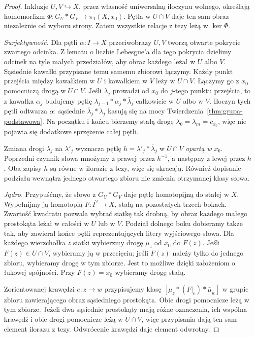 \begin{proof}
Inkluzje $U,V\hookrightarrow X$, przez własność uniwersalną
iloczynu wolnego, określają homomorfizm
$\Phi:G_U*G_V\to\pi_1(X,x_0)$.
Pętla w $U\cap V$ daje ten sam obraz
niezależnie od wyboru strony.
Zatem wszystkie relacje z tezy
leżą w $\ker\Phi$.

\emph{Surjektywność.} Dla pętli
$\alpha:I\to X$ przeciwobrazy $U,V$
tworzą otwarte pokrycie zwartego odcinka.
Z lematu o liczbie Lebesgue'a dla tego pokrycia
dzielimy odcinek na tyle małych przedziałów,
aby obraz każdego leżał w $U$ albo $V$.
Sąsiednie kawałki przypisane temu
samemu zbiorowi łączymy. Każdy
punkt przejścia między kawałkiem
w $U$ i kawałkiem w $V$ leży w
$U\cap V$. Łączymy go z $x_0$
pomocniczą drogą w $U\cap V$.
Jeśli $\lambda_j$ prowadzi od $x_0$
do $j$-tego punktu przejścia,
to z kawałka $\alpha_j$ budujemy
pętlę $\lambda_{j-1}*\alpha_j*
\bar\lambda_j$ całkowicie w $U$
albo w $V$. Iloczyn tych pętli
odtwarza $\alpha$: sąsiednie
$\bar\lambda_j*\lambda_j$
kasują się na mocy
Twierdzenia~\ref{thm:grupa-podstawowa}.
Na początku i końcu bierzemy stałą drogę
$\lambda_0=\lambda_m=c_{x_0}$, więc nie pojawia się
dodatkowe sprzężenie całej pętli.

Zmiana drogi $\lambda_j$ na $\lambda'_j$
wyznacza pętlę $h=\lambda'_j*\bar\lambda_j$ w $U\cap V$
\emph{opartą w $x_0$}. Poprzedni czynnik słowa mnożymy z prawej
przez $h^{-1}$, a następny z lewej przez $h$.
Oba zapisy $h$ są równe w ilorazie z tezy, więc się skracają.
Również dopisanie podziału wewnątrz
jednego otwartego zbioru nie zmienia
otrzymanej klasy słowa.

\emph{Jądro.} Przypuśćmy, że słowo
z $G_U*G_V$ daje pętlę homotopijną
do stałej w $X$. Wypełnijmy ją
homotopią $F:I^2\to X$, stałą na
pozostałych trzech bokach.
Zwartość kwadratu pozwala wybrać
siatkę tak drobną, by obraz
każdego małego prostokąta leżał
w całości w $U$ lub w $V$.
Podział dolnego boku dobieramy także tak, aby zawierał końce
pętli reprezentujących litery wyjściowego słowa.
Dla każdego wierzchołka $z$ siatki wybierzmy drogę $\mu_z$
od $x_0$ do $F(z)$. Jeśli $F(z)\in U\cap V$, wybieramy ją
w przecięciu; jeśli $F(z)$ należy tylko do jednego zbioru,
wybieramy drogę w tym zbiorze. Jest to możliwe dzięki założeniom
o łukowej spójności. Przy $F(z)=x_0$ wybieramy drogę stałą.

Zorientowanej krawędzi $e:z\to w$ przypisujemy klasę
$[\mu_z*(F|_e)*\bar\mu_w]$ w grupie zbioru zawierającego
obraz sąsiedniego prostokąta. Obie drogi pomocnicze leżą w tym
zbiorze. Jeżeli dwa sąsiednie prostokąty mają różne oznaczenia,
ich wspólna krawędź i obie drogi pomocnicze leżą w $U\cap V$,
więc przypisania dają ten sam element ilorazu z tezy.
Odwrócenie krawędzi daje element odwrotny.


\end{proof}
